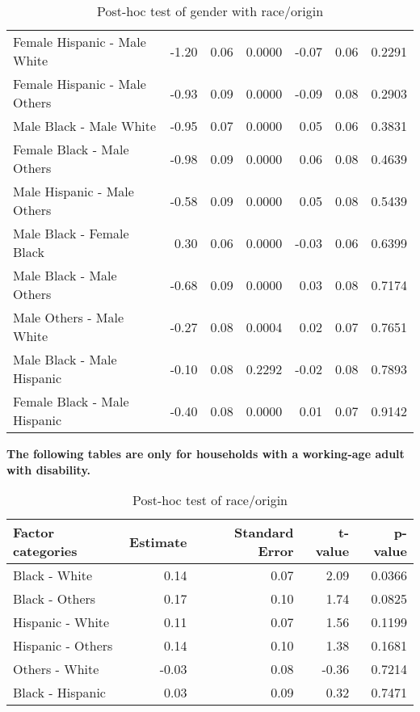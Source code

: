 \documentclass[11pt]{extarticle} %
\begin{document}
\begin{table}[H]
\begin{tabular}{lrrrrrr}
    Female Hispanic -  Male White & -1.20 & 0.06 & 0.0000 & -0.07 & 0.06 & 0.2291 \\ 
    Female Hispanic -  Male Others & -0.93 & 0.09 & 0.0000 & -0.09 & 0.08 & 0.2903 \\ 
    Male Black -  Male White & -0.95 & 0.07 & 0.0000 & 0.05 & 0.06 & 0.3831 \\ 
    Female Black -  Male Others & -0.98 & 0.09 & 0.0000 & 0.06 & 0.08 & 0.4639 \\ 
    Male Hispanic -  Male Others & -0.58 & 0.09 & 0.0000 & 0.05 & 0.08 & 0.5439 \\ 
    Male Black -  Female Black & 0.30 & 0.06 & 0.0000 & -0.03 & 0.06 & 0.6399 \\ 
    Male Black -  Male Others & -0.68 & 0.09 & 0.0000 & 0.03 & 0.08 & 0.7174 \\ 
    Male Others -  Male White & -0.27 & 0.08 & 0.0004 & 0.02 & 0.07 & 0.7651 \\ 
    Male Black -  Male Hispanic & -0.10 & 0.08 & 0.2292 & -0.02 & 0.08 & 0.7893 \\ 
    Female Black -  Male Hispanic & -0.40 & 0.08 & 0.0000 & 0.01 & 0.07 & 0.9142 \\ 
   \hline
\end{tabular}
\caption{Post-hoc test of gender with race/origin} 
\label{tab:GenderRaceOrigin}
\end{table}

{\bf{The following tables are only for households with a working-age adult with disability.}} \\

\begin{table}[H]
\footnotesize
\centering
\begin{tabular}{lrrrr}
  \hline
  Factor categories & Estimate & Standard Error & t-value & p-value \\ 
  \hline
   Black - White & 0.14 & 0.07 & 2.09 & 0.0366 \\ 
   Black - Others & 0.17 & 0.10 & 1.74 & 0.0825 \\ 
   Hispanic - White & 0.11 & 0.07 & 1.56 & 0.1199 \\ 
   Hispanic - Others & 0.14 & 0.10 & 1.38 & 0.1681 \\ 
   Others - White & -0.03 & 0.08 & -0.36 & 0.7214 \\ 
   Black - Hispanic & 0.03 & 0.09 & 0.32 & 0.7471 \\ 
  \hline
\end{tabular}
\caption{Post-hoc test of race/origin} 
\label{tab:DisabRaceOrigin}
\end{table}
\end{document}
